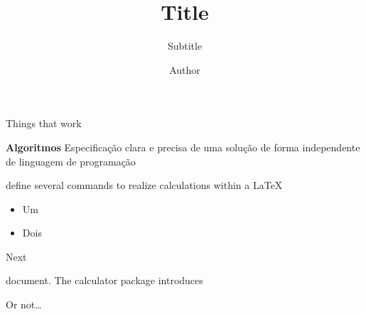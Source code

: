 \documentclass[10pt]{beamer}
\title{Title}
\subtitle{Subtitle}
\author{Author}
\begin{document}
\begin{frame}
    Things that work

    \bigskip
    \begin{horizontalbox}
        \item \textbf{Algoritmos}\vspace{1em}\newline
        Especificação clara e precisa de uma solução de forma independente de linguagem de programação
        \item define several commands to realize calculations within a \LaTeX
        \begin{itemize}
            \item Um
            \item Dois
        \end{itemize}
        Next
        \item document. The calculator package introduces
    \end{horizontalbox}

    \bigskip
    Or not\ldots
\end{frame}
\end{document}
